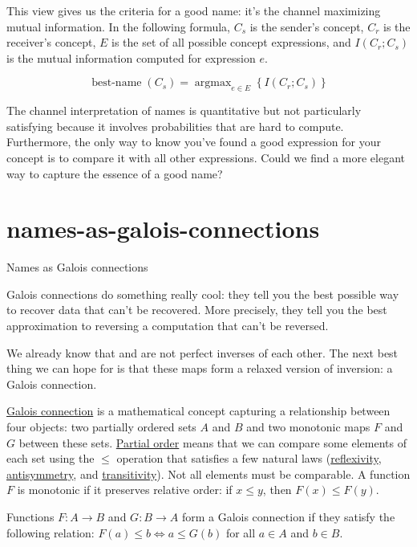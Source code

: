 \documentclass{article}
\begin{document}
This view gives us the criteria for a good name:
it's the channel maximizing mutual information.
In the following formula,
$C_s$ is the sender's concept,
$C_r$ is the receiver's concept,
$E$ is the set of all possible concept expressions,
and $I(C_r; C_s)$ is the mutual information computed for expression $e$.

\[\operatorname{best-name}\left(C_s\right) = \operatorname{argmax}_{e \in E}\left\{I\left(C_r; C_s\right)\right\}\]

The channel interpretation of names is quantitative but not particularly satisfying because it involves probabilities that are hard to compute.
Furthermore, the only way to know you've found a good expression for your concept is to compare it with all other expressions.
Could we find a more elegant way to capture the essence of a good name?

\section{names-as-galois-connections}{Names as Galois connections}
\epigraph{
  Galois connections do something really cool: they tell you the best possible way to recover data that can't be recovered.
  More precisely, they tell you the best approximation to reversing a computation that can't be reversed.
}{}

We already know that  and  are not perfect inverses of each other.
The next best thing we can hope for is that these maps form a relaxed version of inversion: a Galois connection.

\href{https://en.wikipedia.org/wiki/Galois_connection}{Galois connection}
is a mathematical concept capturing a relationship between four objects:
two partially ordered sets $A$ and $B$
and two monotonic maps $F$ and $G$ between these sets.
\href{https://en.wikipedia.org/wiki/Partially_ordered_set#Partial_orders}{Partial order}
means that we can compare some elements of each set using the $\leq$ operation that satisfies a few natural laws
(\href{https://en.wikipedia.org/wiki/Reflexive_relation}{reflexivity},
\href{https://en.wikipedia.org/wiki/Antisymmetric_relation}{antisymmetry},
and \href{https://en.wikipedia.org/wiki/Transitive_relation}{transitivity}).
Not all elements must be comparable.
A function $F$ is monotonic if it preserves relative order:
if $x \leq y$, then $F(x) \leq F(y)$.

Functions $F: A \rightarrow B$ and $G: B \rightarrow A$
form a Galois connection if they satisfy the following relation:
$F(a) \leq b \iff a \leq G(b)$ for all $a \in A$ and $b \in B$.
\end{document}
